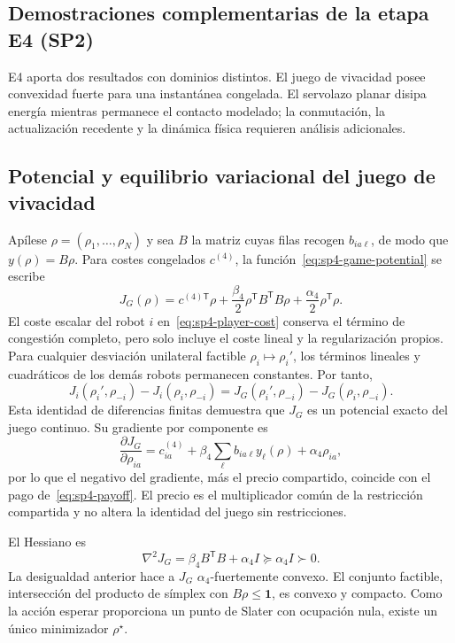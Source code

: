 \subsection{Demostraciones complementarias de la etapa E4 (SP2)}
\label{app:sp4-proofs}

E4 aporta dos resultados con dominios distintos. El juego de vivacidad posee convexidad fuerte para una instantánea congelada. El servolazo planar disipa energía mientras permanece el contacto modelado; la conmutación, la actualización recedente y la dinámica física requieren análisis adicionales.

\subsection{Potencial y equilibrio variacional del juego de vivacidad}
\label{app:sp4-game-proof}

Apílese $\rho=(\rho_1,\ldots,\rho_N)$ y sea $B$ la matriz cuyas filas recogen $b_{ia\ell}$, de modo que $y(\rho)=B\rho$. Para costes congelados $c^{(4)}$, la función~\eqref{eq:sp4-game-potential} se escribe
\[
 J_G(\rho)=c^{(4)\mathsf T}\rho
 +\frac{\beta_4}{2}\rho^{\mathsf T}B^{\mathsf T}B\rho
 +\frac{\alpha_4}{2}\rho^{\mathsf T}\rho.
\]
El coste escalar del robot $i$ en~\eqref{eq:sp4-player-cost} conserva el término de congestión completo, pero solo incluye el coste lineal y la regularización propios. Para cualquier desviación unilateral factible $\rho_i\mapsto\rho_i'$, los términos lineales y cuadráticos de los demás robots permanecen constantes. Por tanto,
\[
 J_i(\rho_i',\rho_{-i})-J_i(\rho_i,\rho_{-i})
 =J_G(\rho_i',\rho_{-i})-J_G(\rho_i,\rho_{-i}).
\]
Esta identidad de diferencias finitas demuestra que $J_G$ es un potencial exacto del juego continuo. Su gradiente por componente es
\[
 \frac{\partial J_G}{\partial\rho_{ia}}
 =c_{ia}^{(4)}+\beta_4\sum_\ell b_{ia\ell}y_\ell(\rho)+\alpha_4\rho_{ia},
\]
por lo que el negativo del gradiente, más el precio compartido, coincide con el pago de~\eqref{eq:sp4-payoff}. El precio es el multiplicador común de la restricción compartida y no altera la identidad del juego sin restricciones.

El Hessiano es
\[
 \nabla^2J_G=\beta_4 B^{\mathsf T}B+\alpha_4 I\succeq\alpha_4 I\succ0.
\]
La desigualdad anterior hace a \(J_G\) \(\alpha_4\)-fuertemente convexo. El conjunto factible, intersección del producto de símplex con \(B\rho\leq\boldsymbol1\), es convexo y compacto. Como la acción esperar proporciona un punto de Slater con ocupación nula, existe un único minimizador \(\rho^\star\).

